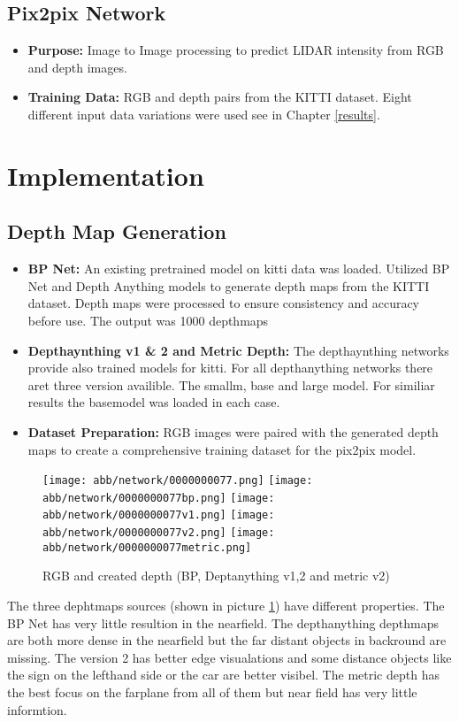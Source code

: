 \subsection{Pix2pix Network}
\begin{itemize}
	\item \textbf{Purpose:} Image to Image processing to predict LIDAR intensity from RGB and depth images.
	\item \textbf{Training Data:} RGB and depth pairs from the KITTI dataset.
	Eight different input data variations were used see in Chapter \ref{results}.
\end{itemize}

\section{Implementation}
\subsection{Depth Map Generation}
\begin{itemize}
	\item \textbf{BP Net:} An existing pretrained model on kitti data was loaded. Utilized BP Net and Depth Anything models to generate depth maps from the KITTI dataset. Depth maps were processed to ensure consistency and accuracy before use. The output was 1000 depthmaps
	
	\item \textbf{Depthaynthing v1 \& 2 and Metric Depth:} The depthaynthing networks provide also trained models for kitti. For all depthanything networks there aret three version availible. The smallm, base and large model. For similiar results the basemodel was loaded in each case.   
	
	\item \textbf{Dataset Preparation:} RGB images were paired with the generated depth maps to create a comprehensive training dataset for the pix2pix model.
	\end{itemize}
\begin{figure}[!ht]
	\centering
	\texttt{[image: abb/network/0000000077.png]}
	\texttt{[image: abb/network/0000000077bp.png]}
	\texttt{[image: abb/network/0000000077v1.png]}
	\texttt{[image: abb/network/0000000077v2.png]}
	\texttt{[image: abb/network/0000000077metric.png]}
	\caption{RGB and created depth (BP, Deptanything v1,2 and metric v2)}
	\label{all_depths}
\end{figure}
The three dephtmaps sources (shown in picture \ref{all_depths}) have different properties. The BP Net has very little resultion in the nearfield. The depthanything depthmaps are both more dense in the nearfield but the far distant objects in backround are missing. The version 2 has better edge visualations and some distance objects like the sign on the lefthand side or the car are better visibel. The metric depth has the best focus on the farplane from all of them but near field has very little informtion. 

